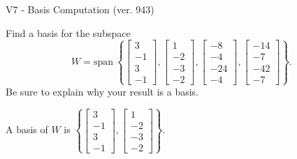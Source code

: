 \begin{exercise}
  \begin{exerciseTitle}V7 - Basis Computation (ver. 943)\end{exerciseTitle}
  \begin{exerciseStatement}
    Find a basis for the subspace 
\[W=\mathrm{span}\ \left\{\left[\begin{array}{r}
3 \\
-1 \\
3 \\
-1
\end{array}\right] , \left[\begin{array}{r}
1 \\
-2 \\
-3 \\
-2
\end{array}\right] , \left[\begin{array}{r}
-8 \\
-4 \\
-24 \\
-4
\end{array}\right] , \left[\begin{array}{r}
-14 \\
-7 \\
-42 \\
-7
\end{array}\right]\right\}.\]
 Be sure to explain why your result is a basis.


  \end{exerciseStatement}
  \begin{exerciseAnswer}
   A basis of \(W\) is  \(\left\{\left[\begin{array}{r}
3 \\
-1 \\
3 \\
-1
\end{array}\right] , \left[\begin{array}{r}
1 \\
-2 \\
-3 \\
-2
\end{array}\right]\right\}\).
  


  \end{exerciseAnswer}
\end{exercise}